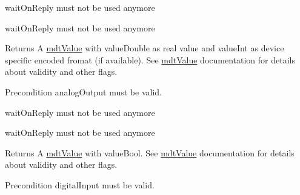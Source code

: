 \begin{DoxyRefList}
\item[\label{deprecated__deprecated000011}%
\hypertarget{deprecated__deprecated000011}{}%
Member \hyperlink{classmdt_multi_io_device_a4adc06753c0d23861e19d6c206b207cb}{mdt\-Multi\-Io\-Device\-:\-:get\-Analog\-Outputs} (bool wait\-On\-Reply=true)]wait\-On\-Reply must not be used anymore  
\item[\label{deprecated__deprecated000010}%
\hypertarget{deprecated__deprecated000010}{}%
Member \hyperlink{classmdt_multi_io_device_a5ec427ff1979b14f7882219f920e0284}{mdt\-Multi\-Io\-Device\-:\-:get\-Analog\-Output\-Value} (\hyperlink{classmdt_analog_io}{mdt\-Analog\-Io} $\ast$analog\-Output, bool query\-Device, bool wait\-On\-Reply=true)]wait\-On\-Reply must not be used anymore \begin{DoxyReturn}{Returns}
A \hyperlink{classmdt_value}{mdt\-Value} with value\-Double as real value and value\-Int as device specific encoded fromat (if available). See \hyperlink{classmdt_value}{mdt\-Value} documentation for details about validity and other flags. 
\end{DoxyReturn}
\begin{DoxyPrecond}{Precondition}
analog\-Output must be valid.  
\end{DoxyPrecond}

\item[\label{deprecated__deprecated000015}%
\hypertarget{deprecated__deprecated000015}{}%
Member \hyperlink{classmdt_multi_io_device_a18d95fd68e45f11397f1ebf7fb7a0a0a}{mdt\-Multi\-Io\-Device\-:\-:get\-Digital\-Inputs} (bool wait\-On\-Reply=true)]wait\-On\-Reply must not be used anymore  
\item[\label{deprecated__deprecated000014}%
\hypertarget{deprecated__deprecated000014}{}%
Member \hyperlink{classmdt_multi_io_device_a13385548121864e4507e92eda5f396db}{mdt\-Multi\-Io\-Device\-:\-:get\-Digital\-Input\-Value} (\hyperlink{classmdt_digital_io}{mdt\-Digital\-Io} $\ast$digital\-Input, bool query\-Device, bool wait\-On\-Reply=true)]wait\-On\-Reply must not be used anymore \begin{DoxyReturn}{Returns}
A \hyperlink{classmdt_value}{mdt\-Value} with value\-Bool. See \hyperlink{classmdt_value}{mdt\-Value} documentation for details about validity and other flags. 
\end{DoxyReturn}
\begin{DoxyPrecond}{Precondition}
digital\-Input must be valid.  
\end{DoxyPrecond}


\end{DoxyRefList}
